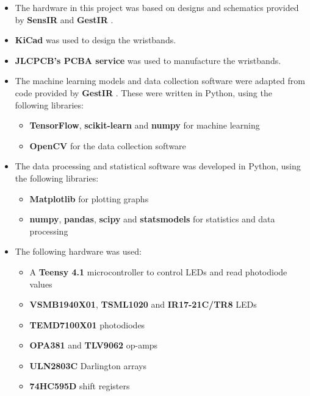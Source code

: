\documentclass[ oneside,%
                    author={Jack Jarvis},
                    degree={BSc},
                     title={FlexIR: Flexible PCB Wristbands for Infrared Based Gesture Recognition},
                    unit={COMS30045},
                    subtitle={Investigating the Effect of LED Viewing Angle on Gesture Classification in Infrared Sensing Systems}]{dissertation}
\begin{document}
\begin{itemize}
    \item The hardware in this project was based on designs and schematics provided by \textbf{SensIR} \cite{McIntosh2017SensIR:Reflection} and \textbf{GestIR} \cite{diamand2025}.
    \item \textbf{KiCad} was used to design the wristbands.
    \item \textbf{JLCPCB's PCBA service} was used to manufacture the wristbands.
    \item The machine learning models and data collection software were adapted from code provided by \textbf{GestIR} \cite{diamand2025}. These were written in Python, using the following libraries:
    \begin{itemize}
        \item \textbf{TensorFlow}, \textbf{scikit-learn} and \textbf{numpy} for machine learning
        \item \textbf{OpenCV} for the data collection software
    \end{itemize}
    \item The data processing and statistical software was developed in Python, using the following libraries:
    \begin{itemize}
        \item \textbf{Matplotlib} for plotting graphs
        \item \textbf{numpy}, \textbf{pandas}, \textbf{scipy} and \textbf{statsmodels} for statistics and data processing
    \end{itemize}
    \item The following hardware was used:
    \begin{itemize}
        \item A \textbf{Teensy 4.1} microcontroller to control LEDs and read photodiode values
        \item \textbf{VSMB1940X01}, \textbf{TSML1020} and \textbf{IR17-21C/TR8} LEDs
        \item \textbf{TEMD7100X01} photodiodes
        \item \textbf{OPA381} and \textbf{TLV9062} op-amps
        \item \textbf{ULN2803C} Darlington arrays
        \item \textbf{74HC595D} shift registers
    \end{itemize}
\end{itemize}

\end{document}
